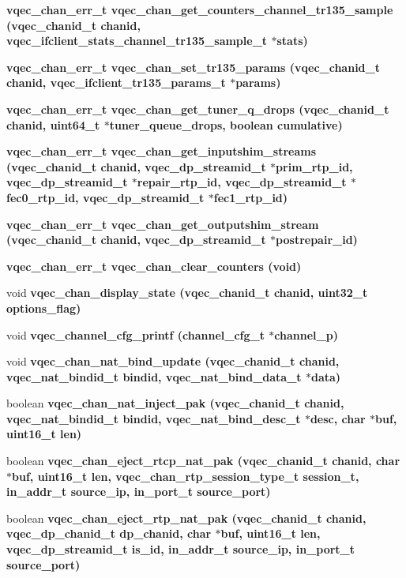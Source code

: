 \begin{CompactItemize}
\bf{vqec\_\-chan\_\-err\_\-t} \bf{vqec\_\-chan\_\-get\_\-counters\_\-channel\_\-tr135\_\-sample} (\bf{vqec\_\-chanid\_\-t} chanid, \bf{vqec\_\-ifclient\_\-stats\_\-channel\_\-tr135\_\-sample\_\-t} $\ast$stats)
\item 
\bf{vqec\_\-chan\_\-err\_\-t} \bf{vqec\_\-chan\_\-set\_\-tr135\_\-params} (\bf{vqec\_\-chanid\_\-t} chanid, \bf{vqec\_\-ifclient\_\-tr135\_\-params\_\-t} $\ast$params)
\item 
\bf{vqec\_\-chan\_\-err\_\-t} \bf{vqec\_\-chan\_\-get\_\-tuner\_\-q\_\-drops} (\bf{vqec\_\-chanid\_\-t} chanid, uint64\_\-t $\ast$tuner\_\-queue\_\-drops, boolean cumulative)
\item 
\bf{vqec\_\-chan\_\-err\_\-t} \bf{vqec\_\-chan\_\-get\_\-inputshim\_\-streams} (\bf{vqec\_\-chanid\_\-t} chanid, vqec\_\-dp\_\-streamid\_\-t $\ast$prim\_\-rtp\_\-id, vqec\_\-dp\_\-streamid\_\-t $\ast$repair\_\-rtp\_\-id, vqec\_\-dp\_\-streamid\_\-t $\ast$fec0\_\-rtp\_\-id, vqec\_\-dp\_\-streamid\_\-t $\ast$fec1\_\-rtp\_\-id)
\item 
\bf{vqec\_\-chan\_\-err\_\-t} \bf{vqec\_\-chan\_\-get\_\-outputshim\_\-stream} (\bf{vqec\_\-chanid\_\-t} chanid, vqec\_\-dp\_\-streamid\_\-t $\ast$postrepair\_\-id)
\item 
\bf{vqec\_\-chan\_\-err\_\-t} \bf{vqec\_\-chan\_\-clear\_\-counters} (void)
\item 
void \bf{vqec\_\-chan\_\-display\_\-state} (\bf{vqec\_\-chanid\_\-t} chanid, uint32\_\-t options\_\-flag)
\item 
void \bf{vqec\_\-channel\_\-cfg\_\-printf} (channel\_\-cfg\_\-t $\ast$channel\_\-p)
\item 
void \bf{vqec\_\-chan\_\-nat\_\-bind\_\-update} (\bf{vqec\_\-chanid\_\-t} chanid, vqec\_\-nat\_\-bindid\_\-t bindid, vqec\_\-nat\_\-bind\_\-data\_\-t $\ast$data)
\item 
boolean \bf{vqec\_\-chan\_\-nat\_\-inject\_\-pak} (\bf{vqec\_\-chanid\_\-t} chanid, vqec\_\-nat\_\-bindid\_\-t bindid, vqec\_\-nat\_\-bind\_\-desc\_\-t $\ast$desc, char $\ast$buf, uint16\_\-t len)
\item 
boolean \bf{vqec\_\-chan\_\-eject\_\-rtcp\_\-nat\_\-pak} (\bf{vqec\_\-chanid\_\-t} chanid, char $\ast$buf, uint16\_\-t len, \bf{vqec\_\-chan\_\-rtp\_\-session\_\-type\_\-t} session\_\-t, in\_\-addr\_\-t source\_\-ip, in\_\-port\_\-t source\_\-port)
\item 
boolean \bf{vqec\_\-chan\_\-eject\_\-rtp\_\-nat\_\-pak} (\bf{vqec\_\-chanid\_\-t} chanid, vqec\_\-dp\_\-chanid\_\-t dp\_\-chanid, char $\ast$buf, uint16\_\-t len, vqec\_\-dp\_\-streamid\_\-t is\_\-id, in\_\-addr\_\-t source\_\-ip, in\_\-port\_\-t source\_\-port)

\end{CompactItemize}
